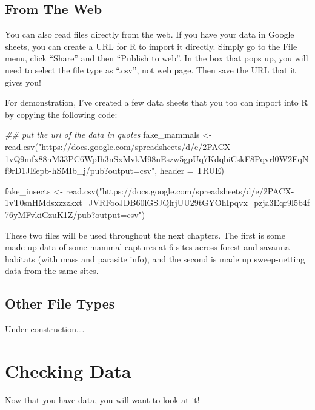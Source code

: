 \documentclass[
  letterpaper,
  DIV=11,
  numbers=noendperiod]{scrreprt}
\newenvironment{Shaded}{\begin{snugshade}}{\end{snugshade}}
\newcommand{\AttributeTok}[1]{\textcolor[rgb]{0.40,0.45,0.13}{#1}}
\newcommand{\ConstantTok}[1]{\textcolor[rgb]{0.56,0.35,0.01}{#1}}
\newcommand{\DocumentationTok}[1]{\textcolor[rgb]{0.37,0.37,0.37}{\textit{#1}}}
\newcommand{\FunctionTok}[1]{\textcolor[rgb]{0.28,0.35,0.67}{#1}}
\newcommand{\NormalTok}[1]{\textcolor[rgb]{0.00,0.23,0.31}{#1}}
\newcommand{\OtherTok}[1]{\textcolor[rgb]{0.00,0.23,0.31}{#1}}
\newcommand{\StringTok}[1]{\textcolor[rgb]{0.13,0.47,0.30}{#1}}
\begin{document}
\subsection{From The Web}\label{sec-web_import}

You can also read files directly from the web. If you have your data in
Google sheets, you can create a URL for R to import it directly. Simply
go to the File menu, click ``Share'' and then ``Publish to web''. In the
box that pops up, you will need to select the file type as ``.csv'', not
web page. Then save the URL that it gives you!

For demonstration, I've created a few data sheets that you too can
import into R by copying the following code:

\begin{Shaded}
\begin{Highlighting}[]
\DocumentationTok{\#\# put the url of the data in quotes}
\NormalTok{fake\_mammals }\OtherTok{\textless{}{-}} \FunctionTok{read.csv}\NormalTok{(}\StringTok{"https://docs.google.com/spreadsheets/d/e/2PACX{-}1vQ9mfx88nM33PC6WpIh3nSxMvkM98nEszw5gpUq7KdqbiCskF8Pqvrl0W2EqNf9rD1JEepb{-}hSMIb\_j/pub?output=csv"}\NormalTok{, }\AttributeTok{header =} \ConstantTok{TRUE}\NormalTok{)}

\NormalTok{fake\_insects }\OtherTok{\textless{}{-}} \FunctionTok{read.csv}\NormalTok{(}\StringTok{"https://docs.google.com/spreadsheets/d/e/2PACX{-}1vT0snHMdsxzzzkxt\_JVRFooJDB60lGSJQlrjUU29tGYOhIpqvx\_pzja3Eqr9l5b4f76yMFvkiGzuK1Z/pub?output=csv"}\NormalTok{)}
\end{Highlighting}
\end{Shaded}

These two files will be used throughout the next chapters. The first is
some made-up data of some mammal captures at 6 sites across forest and
savanna habitats (with mass and parasite info), and the second is made
up sweep-netting data from the same sites.

\subsection{Other File Types}\label{other-file-types}

Under construction\ldots.

\section{Checking Data}\label{checking-data}

Now that you have data, you will want to look at it!
\end{document}

